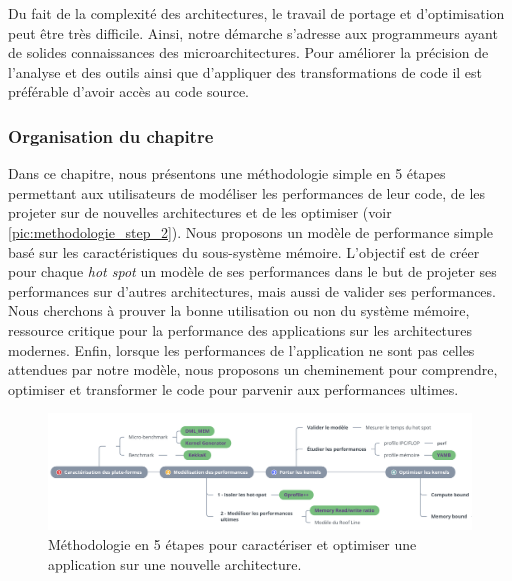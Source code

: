         Du fait de la complexité des architectures, le travail de portage et d'optimisation peut être très difficile. Ainsi, notre démarche s'adresse aux programmeurs ayant de solides connaissances des microarchitectures. Pour améliorer la précision de l'analyse et des outils ainsi que d'appliquer des transformations de code il est préférable d'avoir accès au code source. 
    
        
    \subsubsection{Organisation du chapitre}
    
        Dans ce chapitre, nous présentons une méthodologie simple en 5 étapes permettant aux utilisateurs de modéliser les performances de leur code, de les projeter sur de nouvelles architectures et de les optimiser (voir \autoref{pic:methodologie_step_2}). Nous proposons un modèle de performance simple basé sur les caractéristiques du sous-système mémoire. L'objectif est de créer pour chaque \textit{hot spot} un modèle de ses performances dans le but de projeter ses performances sur d'autres architectures, mais aussi de valider ses performances. Nous cherchons à prouver la bonne utilisation ou non du système mémoire, ressource critique pour la performance des applications sur les architectures modernes. Enfin, lorsque les performances de l'application ne sont pas celles attendues par notre modèle, nous proposons un cheminement pour comprendre, optimiser et transformer le code pour parvenir aux performances ultimes.
    
        \begin{figure}[h!]
        \center
        \includegraphics[width=17cm]{images/methodologie_step.png}
        \caption{\label{pic:methodologie_step_2} Méthodologie en 5 étapes pour caractériser et optimiser une application sur une nouvelle architecture.}
        \end{figure}
    
